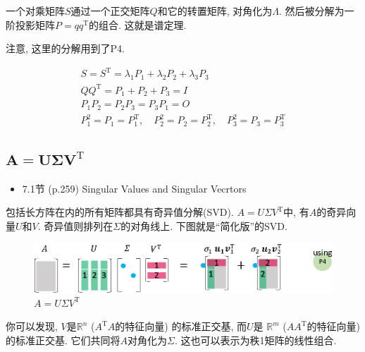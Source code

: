 \documentclass[letterpaper]{article}
\DeclareRobustCommand\transp{^{\mathrm{T}}}
\begin{document}
一个对乘矩阵$S$通过一个正交矩阵$Q$和它的转置矩阵, 对角化为$\Lambda$. 
然后被分解为一阶投影矩阵$P=qq\transp$的组合. 这就是谱定理. 

注意, 这里的分解用到了P4.

\begin{gather*}
  S=S\transp = \lambda_1 P_1 + \lambda_2 P_2 + \lambda_3 P_3\\
  QQ\transp = P_1 + P_2 + P_3 = I \\
  P_1 P_2 = P_2 P_3 = P_3 P_1 = O\\
  P_1^2 =P_1=P_1\transp, \quad P_2^2=P_2=P_2\transp, \quad P_3^2=P_3=P_3\transp
\end{gather*}

\subsection{$\boldsymbol{A=U \Sigma V\transp}$}


\begin{itemize}
  \item 7.1节 (p.259) Singular Values and Singular Vecrtors
\end{itemize}

包括长方阵在内的所有矩阵都具有奇异值分解(SVD). 
$A=U \Sigma V\transp$中, 有$A$的奇异向量$U$和$V$. 
奇异值则排列在$\Sigma$的对角线上. 
下图就是“简化版”的SVD. 


\begin{figure}[H]
  \centering
  \includegraphics[scale=0.8]{SVD.eps}
  \caption{$A=U \Sigma V\transp$}
\end{figure}

你可以发现, $V$是$\mathbb{R}^n$ ($A\transp A$的特征向量) 的标准正交基, 
而$U$是 $\mathbb{R}^m$ ($AA\transp$的特征向量) 的标准正交基. 
它们共同将$A$对角化为$\Sigma$. 
这也可以表示为秩1矩阵的线性组合. 
\end{document}
